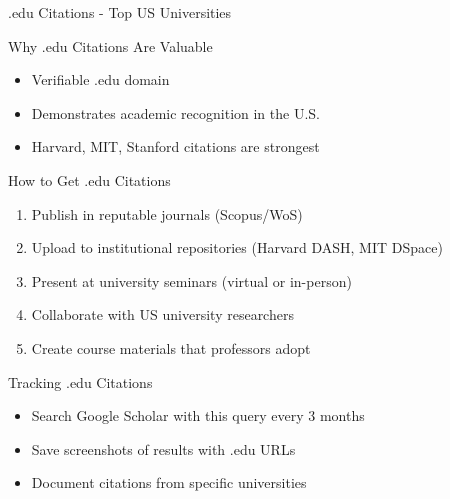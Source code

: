 \documentclass[11pt]{beamer}
\begin{document}
	\begin{frame}{.edu Citations - Top US Universities}
		\scriptsize
		\begin{block}{Why .edu Citations Are Valuable}
			\begin{itemize}
				\item Verifiable .edu domain
				\item Demonstrates academic recognition in the U.S.
				\item Harvard, MIT, Stanford citations are strongest
			\end{itemize}
		\end{block}
		\begin{block}{How to Get .edu Citations}
			\begin{enumerate}
				\item Publish in reputable journals (Scopus/WoS)
				\item Upload to institutional repositories (Harvard DASH, MIT DSpace)
				\item Present at university seminars (virtual or in-person)
				\item Collaborate with US university researchers
				\item Create course materials that professors adopt
			\end{enumerate}
		\end{block}
		\begin{block}{Tracking .edu Citations}
			\begin{itemize}
				\item Search Google Scholar with this query every 3 months
				\item Save screenshots of results with .edu URLs
				\item Document citations from specific universities
			\end{itemize}
		\end{block}
	\end{frame}
	
	
	
\end{document}
